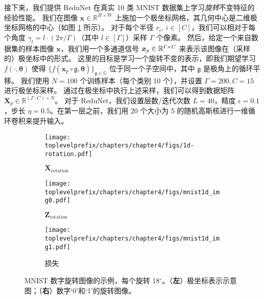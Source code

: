 \documentclass[../../book-main_zh.tex]{subfiles}
\begin{document}
\begin{example}[数字的不变分类]
接下来，我们提供 ReduNet 在真实 10 类 MNIST 数据集上学习\textit{旋转}不变特征的经验性能。
我们在图像 $\bm{x}\in\mathbb{R}^{H\times W}$ 上施加一个极坐标网格，其几何中心是二维极坐标网格的中心（如图 \ref{fig:samples-invariant-1d-mnist-diagram} 所示）。
对于每个半径 $r_i$, $i \in [C]$，我们可以相对于每个角度 $\gamma_l =l\cdot({2\pi}/\Gamma)$（其中 $l \in [\Gamma]$）采样 $\Gamma$ 个像素。
然后，给定一个来自数据集的样本图像 $\bm{x}$，我们用一个多通道信号 $\bm{x}_p \in\mathbb{R}^{\Gamma\times C}$ 来表示该图像在（采样的）极坐标中的形式。
这里的目标是学习一个旋转不变的表示，即我们期望学习 $f(\cdot, \bm{\theta})$ 使得 $\{f(\bm{x}_p \circ \mathfrak{g}, \bm{\theta})\}_{\mathfrak{g} \in\mathbb{G}}$ 位于同一个子空间中，其中 $\mathfrak{g}$ 是极角上的循环平移。
我们使用 $N=100$ 个训练样本（每个类别 10 个），并设置 $\Gamma=200, C=15$ 进行极坐标采样。
通过在极坐标中执行上述采样，我们可以得到数据矩阵 $\bm{X}_p \in \mathbb{R}^{(\Gamma\cdot C) \times N}$。
对于 ReduNet，我们设置层数/迭代次数 $L=40$，精度 $\epsilon=0.1$，步长 $\eta=0.5$。在第一层之前，我们用 20 个大小为 5 的随机高斯核进行一维循环卷积来提升输入。

\begin{figure}[t]
    \begin{subfigure}[t]{0.3\textwidth}
        \centering
        \texttt{[image: \\toplevelprefix/chapters/chapter4/figs/1d-rotation.pdf]}
        \caption{$\bm{X}_{\text{rotation}}$}
    \end{subfigure}
    \hfill
    \begin{subfigure}[t]{0.3\textwidth}
        \centering
        \texttt{[image: \\toplevelprefix/chapters/chapter4/figs/mnist1d\_img0.pdf]}
        \caption{$\bm{Z}_{\text{rotation}}$}
    \end{subfigure}
    \hfill
    \begin{subfigure}[t]{0.3\textwidth}
        \centering
        \texttt{[image: \\toplevelprefix/chapters/chapter4/figs/mnist1d\_img1.pdf]}
        \caption{损失}
    \end{subfigure}
    \caption{\small MNIST 数字旋转图像的示例，每个旋转 18$^{\circ}$。（\textbf{左}）极坐标表示示意图；（\textbf{右}）数字‘0’和‘1’的旋转图像。}
    \label{fig:samples-invariant-1d-mnist-diagram}
\end{figure}



\end{example}
\end{document}
